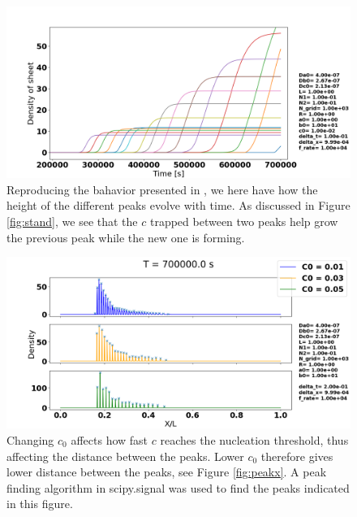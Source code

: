 \documentclass[1p]{elsarticle}        	%
\begin{document}
\begin{figure}
	\centering
	\includegraphics[width=\linewidth]{../figures/peak_growth.png}
	\caption{Reproducing the bahavior presented in \cite{einarsrud}, we here have how the height of the different peaks evolve with time. As discussed in Figure \ref{fig:stand}, we see that the $c$ trapped between two peaks help grow the previous peak while the new one is forming.}
	\label{fig:coords}
\end{figure}

\begin{figure}
	\centering
	\includegraphics[width=\linewidth]{../figures/deltaC0_s.png}
	\caption{Changing $c_0$ affects how fast $c$ reaches the nucleation threshold, thus affecting the distance between the peaks. Lower $c_0$ therefore gives lower distance between the peaks, see Figure \ref{fig:peakx}. A peak finding algorithm in scipy.signal was used to find the peaks indicated in this figure.}
	\label{fig:peak}
\end{figure}
\end{document}
